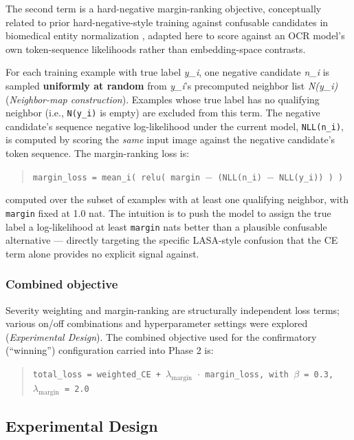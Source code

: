 \documentclass[fleqn,10pt]{wlpeerj}
\begin{document}
The second term is a hard-negative margin-ranking objective, conceptually related to prior hard-negative-style training against confusable candidates in biomedical entity normalization \citep{sung2020biomedical,yuan2022coder}, adapted here to score against an OCR model's own token-sequence likelihoods rather than embedding-space contrasts.

For each training example with true label \emph{y\_i}, one negative candidate \emph{n\_i} is sampled \textbf{uniformly at random} from \emph{y\_i}'s precomputed neighbor list \emph{N(y\_i)} (\textit{Neighbor-map construction}). Examples whose true label has no qualifying neighbor (i.e., \texttt{N(y\_i)} is empty) are excluded from this term. The negative candidate's sequence negative log-likelihood under the current model, \texttt{NLL(n\_i)}, is computed by scoring the \emph{same} input image against the negative candidate's token sequence. The margin-ranking loss is:

\begin{quote}
\texttt{margin\_loss = mean\_i( relu( margin $-$ (NLL(n\_i) $-$ NLL(y\_i)) ) )}
\end{quote}

computed over the subset of examples with at least one qualifying neighbor, with \texttt{margin} fixed at 1.0 nat. The intuition is to push the model to assign the true label a log-likelihood at least \texttt{margin} nats better than a plausible confusable alternative --- directly targeting the specific LASA-style confusion that the CE term alone provides no explicit signal against.

\subsubsection*{Combined objective}\label{sec:combined-objective}

Severity weighting and margin-ranking are structurally independent loss terms; various on/off combinations and hyperparameter settings were explored (\textit{Experimental Design}). The combined objective used for the confirmatory (``winning'') configuration carried into Phase 2 is:

\begin{quote}
\texttt{total\_loss = weighted\_CE + $\lambda_{\text{margin}}$ $\cdot$ margin\_loss, with $\beta$ = 0.3, $\lambda_{\text{margin}}$ = 2.0}
\end{quote}

\subsection*{Experimental Design}\label{sec:experimental-design}
\end{document}
